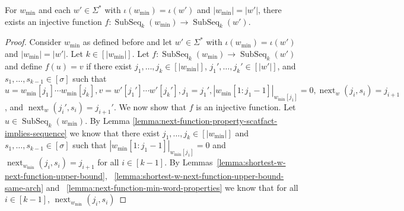 \documentclass[runningheads,UKenglish,cleveref, autoref, thm-restate]{llncs}
\DeclareMathOperator\ScatFact{SubSeq}
\DeclareMathOperator{\nextAlphPos}{next}
\newif\ifpaper
\begin{document}
\begin{proposition}\label{proposition:min-sf-word-injective-function}
    For $w_{\min}$ and each $w'\in\Sigma^{*}$ with
    $\iota(w_{\min}) = \iota(w')$ and $|w_{\min}| = |w'|$, there exists an injective function
    $f : \ScatFact_k(w_{\min}) \rightarrow \ScatFact_k(w')$.
\end{proposition}
\ifpaper
\begin{proof}
	Consider $w_{\min}$ as defined before and let $w'\in\Sigma^*$ with $\iota(w_{\min}) = \iota(w')$
	and $|w_{\min}| = |w'|$. Let $k\in[|w_{\min}|]$.
	Let $f : \ScatFact_k(w_{\min}) \rightarrow \ScatFact_k(w')$ and define $f(u) = v$
	if there exist $j_1,\ldots,j_k\in[|w_{\min}|]$, $j_1',\ldots,j_k'\in[|w'|]$, and $s_1,\ldots,s_{k-1}\in[\sigma]$ such that $u = w_{\min}[j_1]\cdots w_{\min}[j_k], v = w'[j_1'] \cdots w'[j_k'], j_1 = j_1',|w_{\min}[1:j_1-1]|_{w_{\min}[j_1]} = 0, \nextAlphPos_w(j_i,s_i) = j_{i+1}$, and $\nextAlphPos_w(j_i',s_i) = j_{i+1}'$.
	We now show that $f$ is an injective function.
	Let $u\in\ScatFact_k(w_{\min})$.
	By Lemma \ref{lemma:next-function-property-scatfact-implies-sequence} we know that there exist $j_1,\ldots,j_k\in[|w_{\min}|]$ and
	$s_1,\ldots,s_{k-1}\in[\sigma]$ such that $|w_{\min}[1:j_1-1]|_{w_{\min}[j_1]} = 0$ and $\nextAlphPos_{w_{\min}}(j_i,s_i) = j_{i+1}$
	for all $i\in[k-1]$.
	By Lemmas~\ref{lemma:shortest-w-next-function-upper-bound}, ~\ref{lemma:shortest-w-next-function-upper-bound-same-arch}
	and ~\ref{lemma:next-function-min-word-properties} we know that for all $i\in[k-1]$, $\nextAlphPos_{w_{\min}}(j_i,s_i)$

\end{proof}
\end{document}
